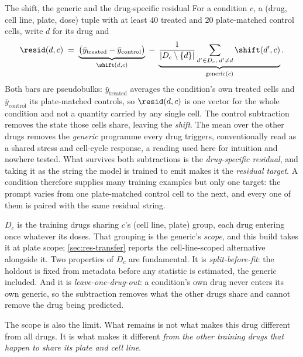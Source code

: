 \begin{defn}{The shift, the generic and the drug-specific residual}
For a condition $c$, a (drug, cell line, plate, dose) tuple with at least $40$
treated and $20$ plate-matched control cells, write $d$ for its drug and
\begin{equation}
 \resid(d,c) \;=\;
 \underbrace{\big(\bar{y}_{\textrm{treated}} - \bar{y}_{\textrm{control}}\big)}_{\shift(d,c)}
 \;-\;
 \underbrace{\frac{1}{|D_c \setminus \{d\}|}
   \sum_{d' \in D_c,\; d' \neq d} \shift(d',c)}_{\textrm{generic}(c)} .
\end{equation}
Both bars are pseudobulks: $\bar{y}_{\textrm{treated}}$ averages the condition's
own treated cells and $\bar{y}_{\textrm{control}}$ its plate-matched controls, so
$\resid(d,c)$ is one vector for the whole condition and not a quantity carried by
any single cell. The control subtraction removes the state those cells share,
leaving the \emph{shift}. The mean over the other drugs removes the \emph{generic}
programme every drug triggers, conventionally read as a shared stress and
cell-cycle response, a reading used here for intuition and nowhere tested. What
survives both subtractions is the \emph{drug-specific residual}, and taking it as
the string the model is trained to emit makes it the \emph{residual target}. A
condition therefore supplies many training examples but only one target: the
prompt varies from one plate-matched control cell to the next, and every one of
them is paired with the same residual string.

\smallskip
$D_c$ is the training drugs sharing $c$'s (cell line, plate) group, each drug
entering once whatever its doses. That grouping is the generic's \emph{scope},
and this build takes it at plate scope; \cref{sec:res-transfer} reports the
cell-line-scoped alternative alongside it. Two properties of $D_c$ are fundamental. It is \emph{split-before-fit}: the holdout is fixed from metadata
before any statistic is estimated, the generic included. And it is
\emph{leave-one-drug-out}: a condition's own drug never enters its own generic,
so the subtraction removes what the other drugs share and cannot remove the drug
being predicted.

\smallskip
The scope is also the limit. What remains is not what makes this drug different
from all drugs. It is what makes it different \emph{from the other training
drugs that happen to share its plate and cell line}.
\end{defn}
